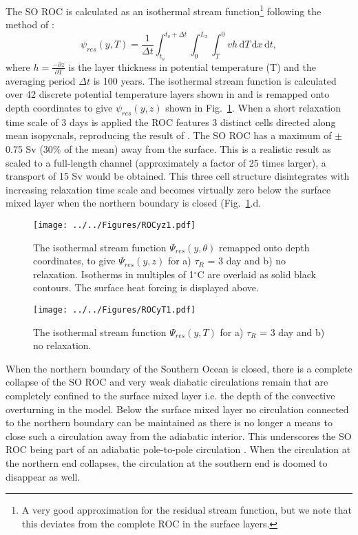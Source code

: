 The SO ROC is calculated as an isothermal stream function\footnote{A very good approximation for the residual stream function, but we note that this deviates from the complete ROC in the surface layers.} following the method of \citet{Abernathey2011}:
\begin{equation}
\psi_{res}(y, T)= \frac{1}{\Delta t} \int_{t_o}^{t_{o}+\Delta t} \int_{0}^{L_x}  \int_{T}^{0} vh \,\mathrm{d}T \,\mathrm{d}x\,\mathrm{d}t,
\label{eq:psidense} 
\end{equation} 
where $\displaystyle{h = \frac{-\partial z}{\partial T}}$ is the layer thickness in potential temperature (T) and the averaging period $\Delta t$ is 100 years. The isothermal stream function is calculated over 42 discrete potential temperature layers shown in  and is remapped onto depth coordinates to give $\psi_{res}(y,z)$ shown in Fig.~\ref{fig:MOC+Remap}.
When a short relaxation time scale of 3 days is applied the ROC features 3 distinct cells directed along mean isopycnals, reproducing the result of \cite{Abernathey2011}. The SO ROC has a maximum of $\pm$ 0.75 Sv (30$\%$ of the mean) away from the surface. This is a realistic result as scaled to a full-length channel (approximately a factor of 25 times larger), a transport of 15 Sv would be obtained. This three cell structure disintegrates with increasing relaxation time scale and becomes virtually zero below the surface mixed layer when the northern boundary is closed (Fig.~\ref{fig:MOC+Remap}.d. 

\begin{figure}[H]
\noindent \texttt{[image: ../../Figures/ROCyz1.pdf]}
\caption{The isothermal stream function $\Psi_{res}(y,\theta)$ remapped onto depth coordinates, to give $\Psi_{res}(y,z)$ for a) $\tau _R$ = 3 day and b) no relaxation. Isotherms in multiples of 1$^{\circ}$C are overlaid as solid black contours. The surface heat forcing is displayed above.}
\label{fig:MOC+Remap}
\end{figure}

\begin{figure}[H]
\noindent \texttt{[image: ../../Figures/ROCyT1.pdf]}
\caption{The isothermal stream function $\Psi_{res}(y,T)$ for a) $\tau _R$ = 3 day and b) no relaxation.}
\label{fig:RemapT1}
\end{figure}

When the northern boundary of the Southern Ocean is closed, there is a complete collapse of the SO ROC and very weak diabatic circulations remain that are completely confined to the surface mixed layer i.e. the depth of the convective overturning in the model. Below the surface mixed layer no circulation connected to the northern boundary can be maintained as there is no longer a means to close such a circulation away from the adiabatic interior. This underscores the SO ROC being part of an adiabatic pole-to-pole circulation \citep{Wolfe2011}. When the circulation at the northern end collapses, the circulation at the southern end is doomed to disappear as well. 

